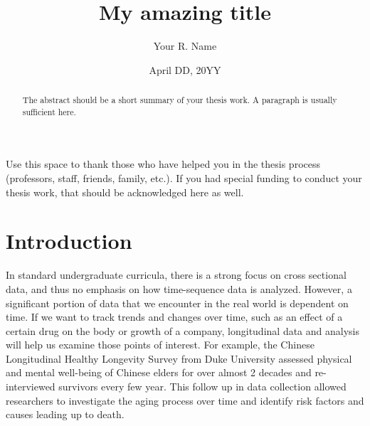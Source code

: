 \documentclass[12pt, twoside]{amherstthesis}
\title{My amazing title}
\author{Your R. Name}
\date{April DD, 20YY}
\begin{document}
\doublespace
  \maketitle

\frontmatter %
\pagestyle{fancyplain}

  \begin{abstract}
    The abstract should be a short summary of your thesis work. A paragraph is usually sufficient here.
  \end{abstract}
  \begin{acknowledgments}
    Use this space to thank those who have helped you in the thesis process (professors, staff, friends, family, etc.). If you had special funding to conduct your thesis work, that should be acknowledged here as well.
  \end{acknowledgments}

  \hypersetup{linkcolor=black}
  \setcounter{tocdepth}{2}
  \tableofcontents

  \listoftables

  \listoffigures


\mainmatter %
\pagestyle{fancyplain} %

\hypertarget{intro}{%
\chapter{Introduction}\label{intro}}

In standard undergraduate curricula, there is a strong focus on cross sectional data, and thus no emphasis on how time-sequence data is analyzed. However, a significant portion of data that we encounter in the real world is dependent on time. If we want to track trends and changes over time, such as an effect of a certain drug on the body or growth of a company, longitudinal data and analysis will help us examine those points of interest. For example, the Chinese Longitudinal Healthy Longevity Survey from Duke University assessed physical and mental well-being of Chinese elders for over almost 2 decades and re-interviewed survivors every few year. This follow up in data collection allowed researchers to investigate the aging process over time and identify risk factors and causes leading up to death.
\end{document}
